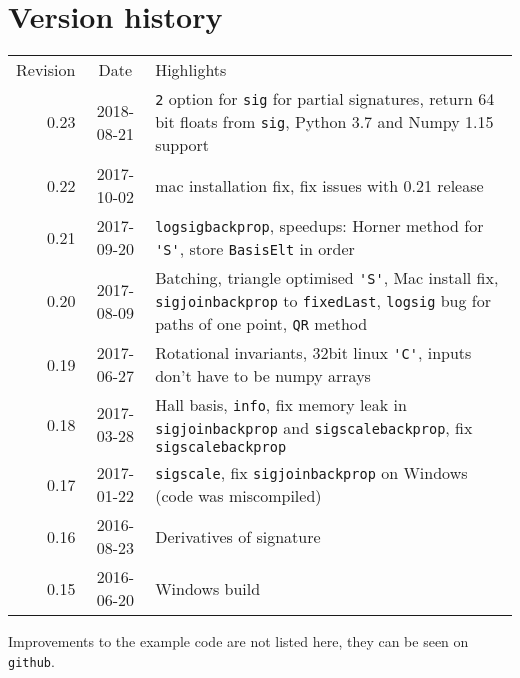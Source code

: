 \documentclass[a4paper]{extarticle}
\begin{document}
\section{Version history}
\begin{tabular}{rcp{}}
Revision&Date&Highlights\\[2mm]
0.23&2018-08-21&\verb|2| option for \verb|sig| for partial signatures, return 64 bit floats from \verb|sig|, Python 3.7 and Numpy 1.15 support\\
0.22&2017-10-02&mac installation fix, fix issues with 0.21 release\\ %
0.21&2017-09-20&\verb|logsigbackprop|, %
speedups: Horner method for \verb|'S'|, store \verb|BasisElt| in order\\
0.20&2017-08-09&Batching, triangle optimised \verb|'S'|, Mac install fix, \verb|sigjoinbackprop| to \verb|fixedLast|, \verb|logsig| bug for paths of one point, \verb|QR| method\\
0.19&2017-06-27&Rotational invariants, 32bit linux \verb|'C'|, inputs don't have to be numpy arrays\\
0.18&2017-03-28&Hall basis, \verb|info|, fix memory leak in \verb|sigjoinbackprop| and \verb|sigscalebackprop|, fix \verb|sigscalebackprop|\\%
0.17&2017-01-22&\verb|sigscale|, fix \verb|sigjoinbackprop| on Windows (code was miscompiled)\\%
0.16&2016-08-23&Derivatives of signature%
\\
0.15&2016-06-20&Windows build\\
\end{tabular}
Improvements to the example code are not listed here, they can be seen on \verb|github|.
\printindex

\printbibliography[heading=bibintoc]
\end{document}
